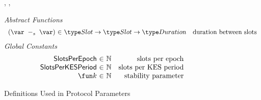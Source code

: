 \begin{figure*}[htb]
\begin{center}
    ,
    ,
  \end{center}
  \emph{Abstract Functions}
  \begin{equation*}
    \begin{array}{r@{~\in~}lr}
      (\slotminus{}{}) & \Slot \to \Slot \to \Duration
                       & \text{duration between slots}
    \end{array}
  \end{equation*}
  \emph{Global Constants}
  \begin{equation*}
    \begin{array}{r@{~\in~}lr}
      \SlotsPerEpoch & \N & \text{slots per epoch} \\
      \SlotsPerKESPeriod & \N & \text{slots per KES period} \\
      \SlotsStabilityParam & \N & \text{stability parameter}
    \end{array}
  \end{equation*}
  \caption{Definitions Used in Protocol Parameters}
  \label{fig:defs:protocol-parameters}
\end{figure*}



\clearpage

